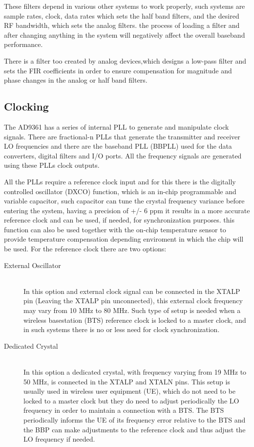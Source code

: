 These filters depend in various other systems to work properly, such systems are sample rates, clock, data rates which sets the half band filters, and the desired RF bandwidth, which sets the analog filters. the process of loading a filter and after changing anything in the system will negatively affect the overall baseband performance. 

There is a filter too created by analog devices,which designs a low-pass filter and sets the FIR coefficients in order to ensure compensation for magnitude and phase changes in the analog or half band filters.

\subsection{Clocking}

The AD9361 has a series of internal PLL to generate and manipulate clock signals. There are fractional-n PLLs that generate the transmitter and receiver LO frequencies and there are the baseband PLL (BBPLL) used for the data converters, digital filters and I/O ports. All the frequency signals are generated using these PLLs clock outputs.

All the PLLs require a reference clock input and for this there is the digitally controlled oscillator (DXCO) function, which is an in-chip programmable and variable capacitor, such capacitor can tune the crystal frequency variance before entering the system, having a precision of +/- 6 ppm it results in a more accurate reference clock and can be used, if needed, for synchronization purposes. this function can also be used together with the on-chip temperature sensor to provide temperature compensation depending enviroment in which the chip will be used. For the reference clock there are two options:

\begin{description}
	\item[External Oscillator] \hfill \\
	In this option and external clock signal can be connected in the XTALP pin (Leaving the XTALP pin unconnected), this external clock frequency may vary from 10 MHz to 80 MHz. Such type of setup is needed when a wireless basestation (BTS) reference clock is locked to a master clock, and in such systems there is no or less need for clock synchronization.

	\item[Dedicated Crystal] \hfill \\
	In this option a dedicated crystal, with frequency varying from 19 MHz to 50 MHz, is connected in the XTALP and XTALN pins. This setup is usually used in wireless user equipment (UE), which do not need to be locked to a master clock but they do need to adjust periodically the LO frequency in order to maintain a connection with a BTS. The BTS periodically informs the UE of its frequency error relative to the BTS and the BBP can make adjustments to the reference clock and thus adjust the LO frequency if needed.

\end{description} 

